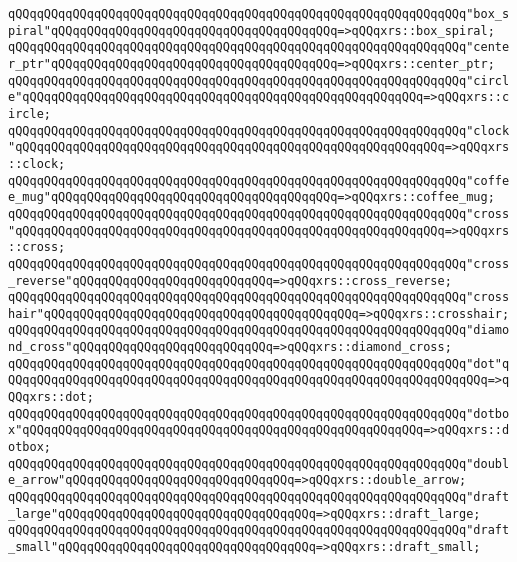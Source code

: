 \verb|qQQqqQQqqQQqqQQqqQQqqQQqqQQqqQQqqQQqqQQqqQQqqQQqqQQqqQQqqQQqqQQq"box_spiral"qQQqqQQqqQQqqQQqqQQqqQQqqQQqqQQqqQQqqQQq=>qQQqxrs::box_spiral;|\newline
\verb|qQQqqQQqqQQqqQQqqQQqqQQqqQQqqQQqqQQqqQQqqQQqqQQqqQQqqQQqqQQqqQQq"center_ptr"qQQqqQQqqQQqqQQqqQQqqQQqqQQqqQQqqQQqqQQq=>qQQqxrs::center_ptr;|\newline
\verb|qQQqqQQqqQQqqQQqqQQqqQQqqQQqqQQqqQQqqQQqqQQqqQQqqQQqqQQqqQQqqQQq"circle"qQQqqQQqqQQqqQQqqQQqqQQqqQQqqQQqqQQqqQQqqQQqqQQqqQQqqQQq=>qQQqxrs::circle;|\newline
\verb|qQQqqQQqqQQqqQQqqQQqqQQqqQQqqQQqqQQqqQQqqQQqqQQqqQQqqQQqqQQqqQQq"clock"qQQqqQQqqQQqqQQqqQQqqQQqqQQqqQQqqQQqqQQqqQQqqQQqqQQqqQQqqQQq=>qQQqxrs::clock;|\newline
\verb|qQQqqQQqqQQqqQQqqQQqqQQqqQQqqQQqqQQqqQQqqQQqqQQqqQQqqQQqqQQqqQQq"coffee_mug"qQQqqQQqqQQqqQQqqQQqqQQqqQQqqQQqqQQqqQQq=>qQQqxrs::coffee_mug;|\newline
\verb|qQQqqQQqqQQqqQQqqQQqqQQqqQQqqQQqqQQqqQQqqQQqqQQqqQQqqQQqqQQqqQQq"cross"qQQqqQQqqQQqqQQqqQQqqQQqqQQqqQQqqQQqqQQqqQQqqQQqqQQqqQQqqQQq=>qQQqxrs::cross;|\newline
\verb|qQQqqQQqqQQqqQQqqQQqqQQqqQQqqQQqqQQqqQQqqQQqqQQqqQQqqQQqqQQqqQQq"cross_reverse"qQQqqQQqqQQqqQQqqQQqqQQqqQQq=>qQQqxrs::cross_reverse;|\newline
\verb|qQQqqQQqqQQqqQQqqQQqqQQqqQQqqQQqqQQqqQQqqQQqqQQqqQQqqQQqqQQqqQQq"crosshair"qQQqqQQqqQQqqQQqqQQqqQQqqQQqqQQqqQQqqQQqqQQq=>qQQqxrs::crosshair;|\newline
\verb|qQQqqQQqqQQqqQQqqQQqqQQqqQQqqQQqqQQqqQQqqQQqqQQqqQQqqQQqqQQqqQQq"diamond_cross"qQQqqQQqqQQqqQQqqQQqqQQqqQQq=>qQQqxrs::diamond_cross;|\newline
\verb|qQQqqQQqqQQqqQQqqQQqqQQqqQQqqQQqqQQqqQQqqQQqqQQqqQQqqQQqqQQqqQQq"dot"qQQqqQQqqQQqqQQqqQQqqQQqqQQqqQQqqQQqqQQqqQQqqQQqqQQqqQQqqQQqqQQqqQQq=>qQQqxrs::dot;|\newline
\verb|qQQqqQQqqQQqqQQqqQQqqQQqqQQqqQQqqQQqqQQqqQQqqQQqqQQqqQQqqQQqqQQq"dotbox"qQQqqQQqqQQqqQQqqQQqqQQqqQQqqQQqqQQqqQQqqQQqqQQqqQQqqQQq=>qQQqxrs::dotbox;|\newline
\verb|qQQqqQQqqQQqqQQqqQQqqQQqqQQqqQQqqQQqqQQqqQQqqQQqqQQqqQQqqQQqqQQq"double_arrow"qQQqqQQqqQQqqQQqqQQqqQQqqQQqqQQq=>qQQqxrs::double_arrow;|\newline
\verb|qQQqqQQqqQQqqQQqqQQqqQQqqQQqqQQqqQQqqQQqqQQqqQQqqQQqqQQqqQQqqQQq"draft_large"qQQqqQQqqQQqqQQqqQQqqQQqqQQqqQQqqQQq=>qQQqxrs::draft_large;|\newline
\verb|qQQqqQQqqQQqqQQqqQQqqQQqqQQqqQQqqQQqqQQqqQQqqQQqqQQqqQQqqQQqqQQq"draft_small"qQQqqQQqqQQqqQQqqQQqqQQqqQQqqQQqqQQq=>qQQqxrs::draft_small;|\newline

